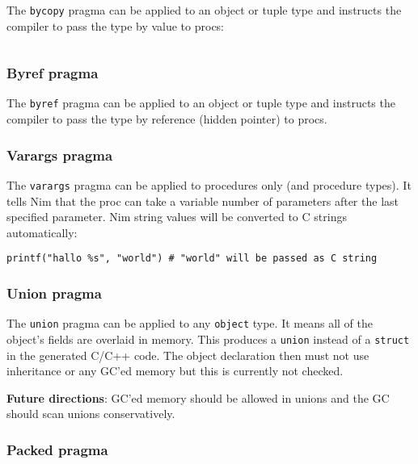 The \texttt{bycopy} pragma can be applied to an object or tuple type and
instructs the compiler to pass the type by value to procs:

\begin{verbatim}
\end{verbatim}

\hypertarget{byref-pragma}{%
\subsubsection{Byref pragma}\label{byref-pragma}}

The \texttt{byref} pragma can be applied to an object or tuple type and
instructs the compiler to pass the type by reference (hidden pointer) to
procs.

\hypertarget{varargs-pragma}{%
\subsubsection{Varargs pragma}\label{varargs-pragma}}

The \texttt{varargs} pragma can be applied to procedures only (and
procedure types). It tells Nim that the proc can take a variable number
of parameters after the last specified parameter. Nim string values will
be converted to C strings automatically:

\begin{verbatim}
printf("hallo %s", "world") # "world" will be passed as C string
\end{verbatim}

\hypertarget{union-pragma}{%
\subsubsection{Union pragma}\label{union-pragma}}

The \texttt{union} pragma can be applied to any \texttt{object} type. It
means all of the object's fields are overlaid in memory. This produces a
\texttt{union} instead of a \texttt{struct} in the generated C/C++ code.
The object declaration then must not use inheritance or any GC'ed memory
but this is currently not checked.

\textbf{Future directions}: GC'ed memory should be allowed in unions and
the GC should scan unions conservatively.

\hypertarget{packed-pragma}{%
\subsubsection{Packed pragma}\label{packed-pragma}}

